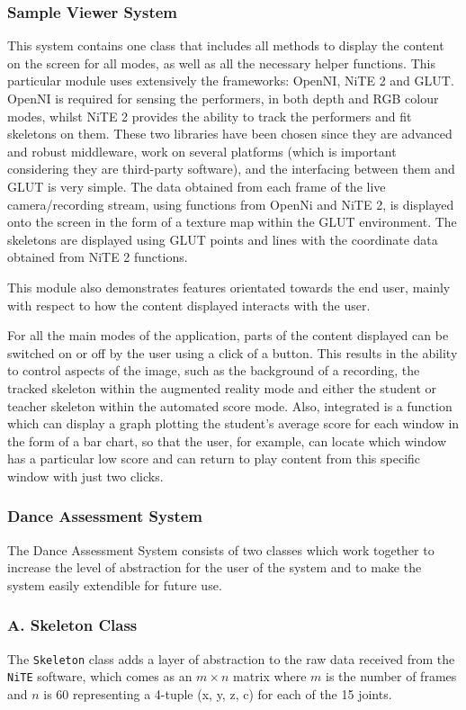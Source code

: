 \documentclass[11pt,a4paper]{article}
\begin{document}
\subsubsection*{Sample Viewer System}

This system contains one class that includes all methods to display the content on the screen for all modes, as well as all the necessary helper functions. This particular module uses extensively the frameworks: OpenNI, NiTE 2 and GLUT. OpenNI is required for sensing the performers, in both depth and RGB colour modes, whilst NiTE 2 provides the ability to track the performers and fit skeletons on them. These two libraries have been chosen since they are advanced and robust middleware, work on several platforms (which is important considering they are third-party software), and the interfacing between them and GLUT is very simple. The data obtained from each frame of the live camera/recording stream, using functions from OpenNi and NiTE 2, is displayed onto the screen in the form of a texture map within the GLUT environment. The skeletons are displayed using GLUT points and lines with the coordinate data obtained from NiTE 2 functions.

\noindent
This module also demonstrates features orientated towards the end user, mainly with respect to how the content displayed interacts with the user.

\noindent
For all the main modes of the application, parts of the content displayed can be switched on or off by the user using a click of a button. This results in the ability to control aspects of the image, such as the background of a recording, the tracked skeleton within the augmented reality mode and either the student or teacher skeleton within the automated score mode. Also, integrated is a function which can display a graph plotting the student's average score for each window in the form of a bar chart, so that the user, for example, can locate which window has a particular low score and can return to play content from this specific window with just two clicks.

\subsubsection*{Dance Assessment System}
\noindent 
The Dance Assessment System consists of two classes which work together to increase the level of abstraction for the user of the system and to make the system easily extendible for future use. 
\subsubsection*{A. Skeleton Class}
\noindent 
The \texttt{Skeleton} class adds a layer of abstraction to the raw data received from the \texttt{NiTE} software, which comes as an $m\times n $ matrix where $m$ is the number of frames and $n$ is 60 representing a 4-tuple (x, y, z, c) for each of the 15 joints.
\end{document}
